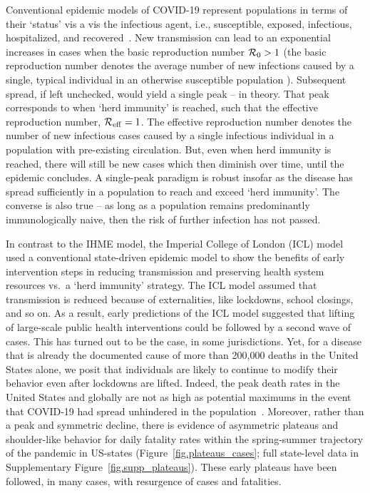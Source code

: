 Conventional epidemic
models of COVID-19 represent populations in terms of their `status' vis
a vis the infectious agent, i.e., susceptible, exposed, infectious,
hospitalized, and recovered~\citep{ferguson2020report,kucharski2020early,kissler_medrxiv2020,park_medrxiv2020,kraemer_2020sci,li_science2020,wu_2020natmed}.
New transmission can lead to an exponential increases in cases 
when the basic reproduction number ${\cal{R}}_0>1$ (the
basic reproduction number denotes the average number of new
infections caused by a single, typical individual in an otherwise
susceptible population \citep{anderson1991infectious}).  Subsequent
spread, if left unchecked, would yield a single peak -- in theory. That 
peak corresponds to when `herd immunity' is reached, such
that the effective reproduction number, ${\cal{R}}_{\mathrm{eff}}=1$.
The effective reproduction number denotes the number of new
infectious cases caused by a single infectious individual
in a population with pre-existing circulation.
But, even when herd immunity is reached, there will still be new cases 
which then diminish over time, until the epidemic concludes.  
A single-peak paradigm is
robust insofar as the disease has spread
sufficiently in a population to reach and exceed `herd immunity'.
The converse
is also true  -- as long as 
a population remains predominantly immunologically
naive, then the risk of further infection has not passed. 

In contrast to the IHME model,
the Imperial College of London (ICL) model~\citep{ferguson2020report} 
used a conventional state-driven epidemic model
to show the benefits of  early intervention steps in reducing
transmission and preserving health system resources vs.~a `herd immunity' strategy.  
The ICL model assumed that
transmission is reduced because of externalities, like lockdowns,
school closings, and so on.  
As a result, early predictions of the ICL model suggested that lifting of large-scale
public health interventions could be followed by a second wave of cases.
This has turned out to be the case, in some jurisdictions.
Yet, for a disease
that is already the documented cause of more than 200,000 deaths
in the United States alone, we posit that individuals
are likely to continue to modify
their behavior even after lockdowns are lifted.  
Indeed, the peak death rates in the United States and globally
are not as high as potential maximums in the event that
COVID-19 had spread unhindered in the population~\citep{ferguson2020report}. 
Moreover, rather than a peak and symmetric decline, there is evidence 
of asymmetric plateaus and shoulder-like
behavior for daily fatality rates within the spring-summer
trajectory of the pandemic in US-states
(Figure~\ref{fig.plateaus_cases}; full state-level data in Supplementary
Figure~\ref{fig.supp_plateaus}).  These early plateaus have
been followed, in many cases, with resurgence of cases and fatalities.  

